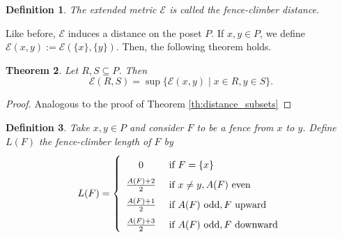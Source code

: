 \documentclass{article}[12pt]
\theoremstyle{exampstyle}
\newtheorem{theorem}{Theorem}[section]
\newtheorem{definition}[theorem]{Definition}
\theoremstyle{remark}
\newcommand{\E}{\mathcal{E}}
\begin{document}
\begin{definition}
   The extended metric $\E$ is called the fence-climber distance. 
\end{definition}

Like before, $\E$ induces a distance on the poset $P$. If $x,y \in P$, we define  $\E(x,y) := \E(\{x\},\{y\})$. Then, the following theorem holds.

\begin{theorem}
    Let $R,S \subseteq P $. Then
    \begin{equation*}
        \E(R,S) = \sup\{ \E(x,y) \mid  x \in R, y \in S \}.
    \end{equation*}
\end{theorem}
\begin{proof}
   Analogous to the proof of Theorem \ref{th:distance_subsets}
\end{proof}

\begin{definition}
    Take $x,y \in P$ and consider $F$ to be a fence from $x$ to $y$. Define $L(F)$ the fence-climber length of $F$ by
    \begin{equation*}
        L(F) = \left\{ 
        \def\arraystretch{1.7}
        \begin{array}{cl}
            0 & \text{ if } F = \{x\}\\
            \frac{A(F) +2}{2} & \text{ if } x \neq y,  A(F) \text{ even} \\
            \frac{A(F) +1}{2} & \text{ if } A(F) \text{ odd}, F \text{ upward}\\
            \frac{A(F) +3}{2} & \text{ if } A(F) \text{ odd}, F \text{ downward}
        \end{array}
        \right.
    \end{equation*}
\end{definition}
\end{document}
